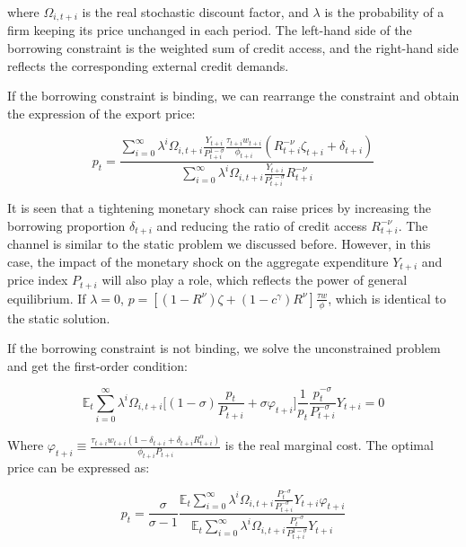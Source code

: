 where $\Omega_{i,t+i}$ is the real stochastic discount factor, and $\lambda$ is the probability of a firm keeping its price unchanged in each period. The left-hand side of the borrowing constraint is the weighted sum of credit access, and the right-hand side reflects the corresponding external credit demands.

If the borrowing constraint is binding, we can rearrange the constraint and obtain the expression of the export price:

\begin{equation}
p_t=\frac{\sum_{i=0}^{\infty} \lambda^i \Omega_{i,t+i}\frac{Y_{t+i}}{P_{t+i}^{1-\sigma}}\frac{\tau_{t+i}w_{t+i}}{\phi_{t+i}}(R_{t+i}^{-\nu}\zeta_{t+i}+\delta_{t+i})}{\sum_{i=0}^{\infty} \lambda^i \Omega_{i,t+i}\frac{Y_{t+i}}{P_{t+i}^{1-\sigma}}R_{t+i}^{-\nu}}
\end{equation}

It is seen that a tightening monetary shock can raise prices by increasing the borrowing proportion $\delta_{t+i}$ and reducing the ratio of credit access $R_{t+i}^{-\nu}$. The channel is similar to the static problem we discussed before. However, in this case, the impact of the monetary shock on the aggregate expenditure $Y_{t+i}$ and price index $P_{t+i}$ will also play a role, which reflects the power of general equilibrium. If $\lambda=0$, $p=[(1-R^{\nu})\zeta+(1-c^\gamma)R^{\nu}] \frac{\tau w}{\phi}$, which is identical to the static solution.


If the borrowing constraint is not binding, we solve the unconstrained problem and get the first-order condition:


\begin{equation}
\mathbb{E}_t \sum_{i=0}^{\infty} \lambda^i \Omega_{i,t+i} \biggr[(1-\sigma)\frac{p_t}{P_{t+i}}+\sigma \varphi_{t+i}\biggr]\frac{1}{p_t}\frac{p_t^{-\sigma}}{P_{t+i}^{-\sigma}}Y_{t+i}=0
\end{equation}

Where $\varphi_{t+i}\equiv \frac{\tau_{t+i} w_{t+i}(1-\delta_{t+i}+\delta_{t+i} R_{t+i}^\alpha)}{\phi_{t+i}P_{t+i}}$ is the real marginal cost. The optimal price can be expressed as:

\begin{equation}
p_t=\frac{\sigma}{\sigma-1}\frac{\mathbb{E}_t \sum_{i=0}^{\infty} \lambda^i \Omega_{i,t+i}\frac{P_t^{-\sigma}}{P_{t+i}^{-\sigma}}Y_{t+i}\varphi_{t+i}}{\mathbb{E}_t \sum_{i=0}^{\infty} \lambda^i \Omega_{i,t+i}\frac{P_t^{-\sigma}}{P_{t+i}^{1-\sigma}}Y_{t+i}}
\end{equation}

